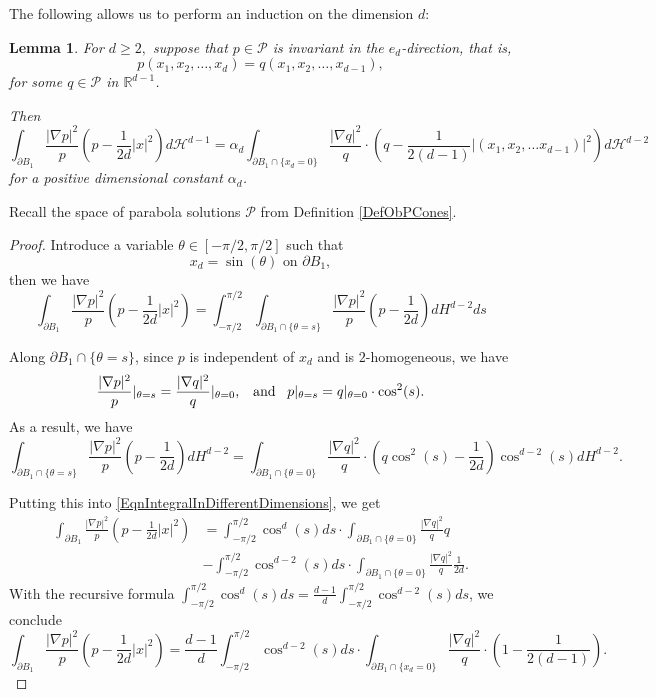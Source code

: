 \documentclass{amsart}
\def\R {\mathbb{R}}
\def\P{\mathcal{P}}
\def\hem{\hspace{0.5em}}
\newtheorem{lem}[thm]{Lemma}
\theoremstyle{definition}
\numberwithin{equation}{section}
\theoremstyle{remark}
\begin{document}
The following allows us to perform an induction on the dimension $d$:
\begin{lem}
\label{LemIntegralInDifferentDimensions}
For $d\ge2,$ suppose that $p\in\P$ is invariant in the $e_d$-direction, that is, 
$$
p(x_1,x_2,\dots,x_d)=q(x_1,x_2,\dots,x_{d-1}),
$$
for some $q\in\P$ in $\R^{d-1}$.

Then 
$$
\int_{\partial B_1}\frac{|\nabla p|^2}{p}(p-\frac{1}{2d}|x|^2)d\mathcal{H}^{d-1}=\alpha_d\int_{\partial B_1\cap\{x_d=0\}}\frac{|\nabla q|^2}{q}\cdot(q-\frac{1}{2(d-1)}|(x_1,x_2,\dots x_{d-1})|^2)d\mathcal{H}^{d-2}
$$
for a positive dimensional constant $\alpha_d$.
\end{lem} 
Recall the space of parabola solutions $\P$ from Definition \ref{DefObPCones}.
\begin{proof}
Introduce a variable $\theta\in[-\pi/2,\pi/2]$ such that 
$$
x_d=\sin(\theta) \text{ on }\partial B_1,
$$
then we have
\begin{equation}
\label{EqnIntegralInDifferentDimensions}
\int_{\partial B_1}\frac{|\nabla p|^2}{p}(p-\frac{1}{2d}|x|^2)=\int_{-\pi/2}^{\pi/2}\int_{\partial B_1\cap\{\theta=s\}}\frac{|\nabla p|^2}{p}(p-\frac{1}{2d})dH^{d-2}ds
\end{equation}

Along $\partial B_1\cap\{\theta=s\}$, since $p$ is independent of $x_d$ and is $2$-homogeneous, we have
$$
\frac{|\nabla p|^2}{p}|_{\theta=s}=\frac{|\nabla q|^2}{q}|_{\theta=0},\hem \text{ and }\hem
p|_{\theta=s}=q|_{\theta=0}\cdot\cos^2(s).
$$
As a result, we have
$$
\int_{\partial B_1\cap\{\theta=s\}}\frac{|\nabla p|^2}{p}(p-\frac{1}{2d})dH^{d-2}=\int_{\partial B_1\cap\{\theta=0\}}\frac{|\nabla q|^2}{q}\cdot(q\cos^2(s)-\frac{1}{2d})\cos^{d-2}(s)dH^{d-2}.
$$

Putting this into \eqref{EqnIntegralInDifferentDimensions}, we get
\begin{align*}
\int_{\partial B_1}\frac{|\nabla p|^2}{p}(p-\frac{1}{2d}|x|^2)&=\int_{-\pi/2}^{\pi/2}\cos^{d}(s)ds\cdot\int_{\partial B_1\cap\{\theta=0\}}\frac{|\nabla q|^2}{q}q\\
&-\int_{-\pi/2}^{\pi/2}\cos^{d-2}(s)ds\cdot\int_{\partial B_1\cap\{\theta=0\}}\frac{|\nabla q|^2}{q}\frac{1}{2d}.
\end{align*}
With the recursive formula $\int_{-\pi/2}^{\pi/2}\cos^{d}(s)ds=\frac{d-1}{d}\int_{-\pi/2}^{\pi/2}\cos^{d-2}(s)ds$, we conclude
$$
\int_{\partial B_1}\frac{|\nabla p|^2}{p}(p-\frac{1}{2d}|x|^2)=\frac{d-1}{d}\int_{-\pi/2}^{\pi/2}\cos^{d-2}(s)ds\cdot\int_{\partial B_1\cap\{x_d=0\}}\frac{|\nabla q|^2}{q}\cdot(1-\frac{1}{2(d-1)}).
$$
\end{proof} 
\end{document}
